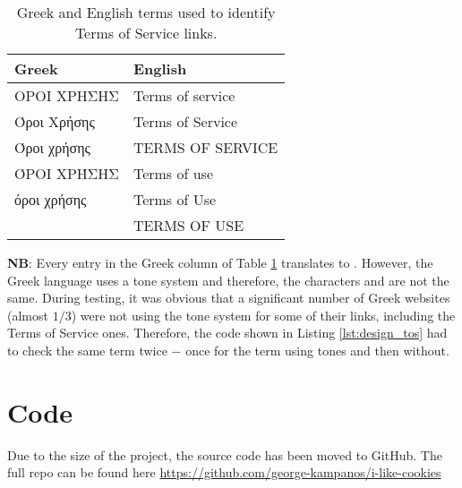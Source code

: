 \documentclass[../main.tex]{subfiles}
\begin{document}
\newpage

\begin{table}[ht]
    \centering
    \begin{tabular}{@{}ll@{}}
    \toprule
        Greek       & English          \\ \midrule
        ΟΡΟΙ ΧΡΗΣΗΣ & Terms of service \\
        Όροι Χρήσης & Terms of Service \\
        Όροι χρήσης & TERMS OF SERVICE \\
        ΌΡΟΙ ΧΡΉΣΗΣ & Terms of use     \\
        όροι χρήσης & Terms of Use     \\
                    & TERMS OF USE     \\ \bottomrule
    \end{tabular}
    \caption{Greek and English terms used to identify Terms of Service links.}
    \label{tab:tos_phrases}
\end{table}

\textbf{NB}: Every entry in the Greek column of Table \ref{tab:tos_phrases} translates to . However, the Greek language uses a tone system and therefore, the characters  and  are not the same. During testing, it was obvious that a significant number of Greek websites (almost $1/3$) were not using the tone system for some of their links, including the Terms of Service ones. Therefore, the code shown in Listing \ref{lst:design_tos} had to check the same term twice $-$ once for the term using tones and then without. 

\section{Code}
\label{section:appendix_code}

Due to the size of the project, the source code has been moved to GitHub. The full repo can be found here \url{https://github.com/george-kampanos/i-like-cookies}
\end{document}
